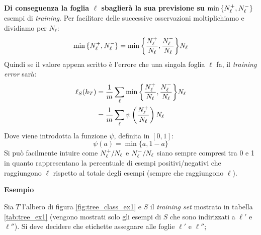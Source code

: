 \textbf{Di conseguenza la foglia $\ell$ sbaglierà la sua previsione su
$\min{\{\ensuremath{N_{\ell}^+},\ensuremath{N_{\ell}^-}\}}$} esempi di \textit{training}. Per facilitare delle successive
osservazioni moltiplichiamo e dividiamo per $N_{\ell}$:
$$ \min{\{\ensuremath{N_{\ell}^+},\ensuremath{N_{\ell}^-}\}} = 
\min{\left\{\frac{\ensuremath{N_{\ell}^+}}{N_{\ell}},\frac{\ensuremath{N_{\ell}^-}}{N_{\ell}}\right\}}N_{\ell} $$
Quindi se il valore appena scritto è l'errore che una singola foglia $\ell$ fa, il
\textit{training error} sarà:
$$ 
\begin{aligned}
\ell_{S}(h_T)
&=\frac{1}{m}\sum_{\ell}\min{\left\{\frac{\ensuremath{N_{\ell}^+}}{N_{\ell}},\frac{\ensuremath{N_{\ell}^-}}{N_{\ell}}\right\}}N_{\ell}\\
&=\frac{1}{m}\sum_{\ell} \psi \left(\frac{N_{\ell}^+}{N_{\ell}}\right)N_{\ell}\\
\end{aligned}
$$
Dove viene introdotta la funzione $\psi$, definita in $[0,1]$:
$$\psi(a) = \min{\{a,1-a\}}$$
Si può facilmente intuire come $N_{\ell}^+/N_{\ell}$ e $N_{\ell}^-/N_{\ell}$ siano
sempre compresi tra 0 e 1 in quanto rappresentano la percentuale di esempi 
positivi/negativi che raggiungono $\ell$ rispetto al totale degli esempi 
(sempre che raggiungono $\ell$).

\textbf{Esempio}

Sia $T$ l'albero di figura \ref{fig:tree_class_ex1} e $S$ il \textit{training set}
mostrato in tabella \ref{tab:tree_ex1} (vengono mostrati solo gli esempi di $S$ che
sono indirizzati a $\ell'$ e $\ell''$).
Si deve decidere che etichette assegnare alle foglie $\ell'$ e $\ell''$;

